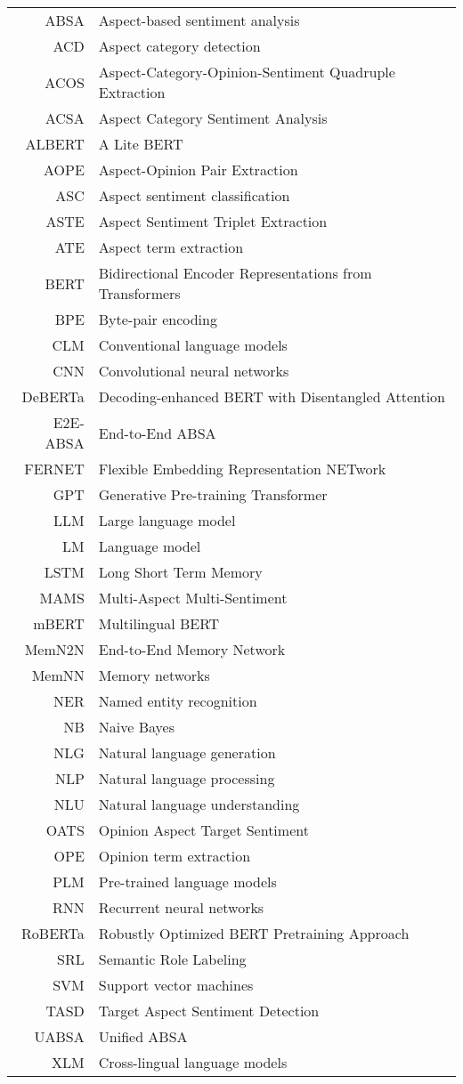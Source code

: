\documentclass[czech,bachelor,oneside]{ctufit-thesis}
\begin{document}
\chapter{\thectufitabbreviationlabel}
\begin{longtable}{rl}
ABSA & Aspect-based sentiment analysis \\
ACD & Aspect category detection \\
ACOS & Aspect-Category-Opinion-Sentiment Quadruple Extraction \\
ACSA & Aspect Category Sentiment Analysis \\
ALBERT & A Lite BERT \\
AOPE & Aspect-Opinion Pair Extraction \\
ASC & Aspect sentiment classification \\
ASTE & Aspect Sentiment Triplet Extraction \\
ATE & Aspect term extraction \\
BERT & Bidirectional Encoder Representations from Transformers \\
BPE & Byte-pair encoding \\
CLM & Conventional language models \\
CNN & Convolutional neural networks \\
DeBERTa & Decoding-enhanced BERT with Disentangled Attention \\
E2E-ABSA & End-to-End ABSA \\
FERNET & Flexible Embedding Representation NETwork \\
GPT & Generative Pre-training Transformer \\
LLM & Large language model \\
LM & Language model \\
LSTM & Long Short Term Memory \\
MAMS & Multi-Aspect Multi-Sentiment \\
mBERT & Multilingual BERT \\
MemN2N & End-to-End Memory Network \\
MemNN & Memory networks \\
NER & Named entity recognition \\
NB & Naive Bayes \\
NLG & Natural language generation \\
NLP & Natural language processing \\
NLU & Natural language understanding \\
OATS & Opinion Aspect Target Sentiment \\
OPE & Opinion term extraction \\
PLM & Pre-trained language models \\
RNN & Recurrent neural networks \\
RoBERTa & Robustly Optimized BERT Pretraining Approach \\
SRL & Semantic Role Labeling \\
SVM & Support vector machines \\
TASD & Target Aspect Sentiment Detection \\
UABSA & Unified ABSA \\
XLM & Cross-lingual language models \\
\end{longtable}
\end{document}

